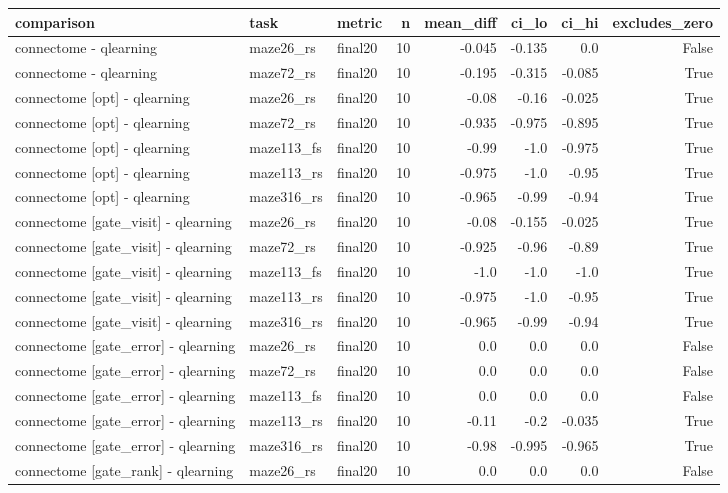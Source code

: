 \begin{table}[t]
\centering
\small
\begin{tabular}{lllrrrrr}
\toprule
comparison & task & metric & n & mean\_diff & ci\_lo & ci\_hi & excludes\_zero \\
\midrule
connectome - qlearning & maze26\_rs & final20 & 10 & -0.045 & -0.135 & 0.0 & False \\
connectome - qlearning & maze72\_rs & final20 & 10 & -0.195 & -0.315 & -0.085 & True \\
connectome [opt] - qlearning & maze26\_rs & final20 & 10 & -0.08 & -0.16 & -0.025 & True \\
connectome [opt] - qlearning & maze72\_rs & final20 & 10 & -0.935 & -0.975 & -0.895 & True \\
connectome [opt] - qlearning & maze113\_fs & final20 & 10 & -0.99 & -1.0 & -0.975 & True \\
connectome [opt] - qlearning & maze113\_rs & final20 & 10 & -0.975 & -1.0 & -0.95 & True \\
connectome [opt] - qlearning & maze316\_rs & final20 & 10 & -0.965 & -0.99 & -0.94 & True \\
connectome [gate\_visit] - qlearning & maze26\_rs & final20 & 10 & -0.08 & -0.155 & -0.025 & True \\
connectome [gate\_visit] - qlearning & maze72\_rs & final20 & 10 & -0.925 & -0.96 & -0.89 & True \\
connectome [gate\_visit] - qlearning & maze113\_fs & final20 & 10 & -1.0 & -1.0 & -1.0 & True \\
connectome [gate\_visit] - qlearning & maze113\_rs & final20 & 10 & -0.975 & -1.0 & -0.95 & True \\
connectome [gate\_visit] - qlearning & maze316\_rs & final20 & 10 & -0.965 & -0.99 & -0.94 & True \\
connectome [gate\_error] - qlearning & maze26\_rs & final20 & 10 & 0.0 & 0.0 & 0.0 & False \\
connectome [gate\_error] - qlearning & maze72\_rs & final20 & 10 & 0.0 & 0.0 & 0.0 & False \\
connectome [gate\_error] - qlearning & maze113\_fs & final20 & 10 & 0.0 & 0.0 & 0.0 & False \\
connectome [gate\_error] - qlearning & maze113\_rs & final20 & 10 & -0.11 & -0.2 & -0.035 & True \\
connectome [gate\_error] - qlearning & maze316\_rs & final20 & 10 & -0.98 & -0.995 & -0.965 & True \\
connectome [gate\_rank] - qlearning & maze26\_rs & final20 & 10 & 0.0 & 0.0 & 0.0 & False \\

\end{tabular}
\end{table}

